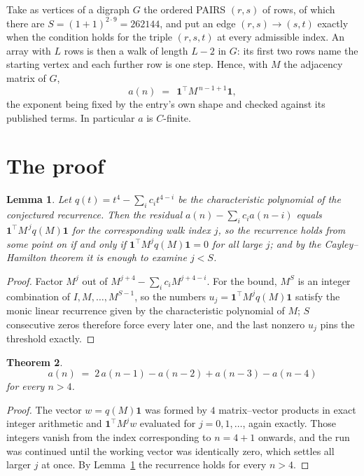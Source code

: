 \documentclass[11pt,a4paper]{article}
\theoremstyle{plain}
\newtheorem{theorem}{Theorem}
\newtheorem{lemma}[theorem]{Lemma}
\theoremstyle{definition}
\begin{document}
Take as vertices of a digraph $G$ the ordered PAIRS $(r,s)$ of rows, of which there are
$S=(1+1)^{2\cdot9}=262144$, and put an edge $(r,s)\to(s,t)$ exactly when the condition
holds for the triple $(r,s,t)$ at every admissible index. An array with $L$ rows is then a
walk of length $L-2$ in $G$: its first two rows name the starting vertex and each further
row is one step. Hence, with $M$ the adjacency matrix of $G$,
\[
a(n)\;=\;\,\mathbf{1}^{\!\top}M^{\,n-1+1}\mathbf{1},
\]
the exponent being fixed by the entry's own shape and checked against its published terms.
In particular $a$ is $C$-finite.

\section{The proof}

\begin{lemma}\label{lem:crit}
Let $q(t)=t^{4}-\sum_i c_it^{4-i}$ be the characteristic polynomial of the
conjectured recurrence. Then the residual $a(n)-\sum_ic_ia(n-i)$ equals
$\mathbf{1}^{\!\top}M^{\,j}q(M)\mathbf{1}$ for the corresponding walk index
$j$, so the recurrence holds from some point on if and only if
$\mathbf{1}^{\!\top}M^{j}q(M)\mathbf{1}=0$ for all large $j$; and by the
Cayley--Hamilton theorem it is enough to examine $j<S$.
\end{lemma}

\begin{proof}
Factor $M^{j}$ out of $M^{j+4}-\sum_ic_iM^{j+4-i}$. For the bound, $M^{S}$
is an integer combination of $I,M,\dots,M^{S-1}$, so the numbers
$u_j=\mathbf{1}^{\!\top}M^{j}q(M)\mathbf{1}$ satisfy the monic linear recurrence given by
the characteristic polynomial of $M$; $S$ consecutive zeros therefore force every later one,
and the last nonzero $u_j$ pins the threshold exactly.
\end{proof}

\begin{theorem}
\[
a(n)\;=\;2\,a(n-1) - a(n-2) + a(n-3) - a(n-4)
\]
for every $n>4$.
\end{theorem}

\begin{proof}
The vector $w=q(M)\mathbf{1}$ was formed by $4$ matrix--vector products in exact
integer arithmetic and $\mathbf{1}^{\!\top}M^{j}w$ evaluated for $j=0,1,\dots$, again
exactly. Those integers vanish from the index corresponding to $n=4+1$ onwards, and the
run was continued until the working vector was identically zero, which settles all larger $j$
at once. By Lemma~\ref{lem:crit} the recurrence holds for every $n>4$.
\end{proof}
\end{document}
